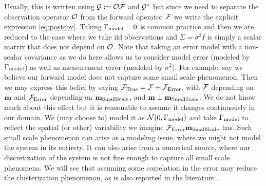 \documentclass{amsart}
\numberwithin{equation}{section}
\begin{document}
Usually, this is written using $\mathcal{G} := \mathcal{O} \mathcal{F}$ and $\mathcal{G}^*$ but
since we need to separate the observation operator $\mathcal{O}$ from the
forward operator $\mathcal{F}$ we write the explicit expression
\eqref{eq:postcov}. Taking $\Gamma_{\textup{model}} = 0$ is common practice
\cite{Tarantola05,KaipioSomersalo05,Vogel02} and then we are reduced
to the case where we take iid observations and $\Sigma = \sigma^2I$ is
simply a scalar matrix that does not depend on $\mathcal{O}$. Note that
taking an error model with a non-scalar covariance as we do here
allows us to consider model error (modeled by $\Gamma_{\textup{model}}$) as well as
measurement error (modeled by $\sigma^2$). For example, say we believe
our forward model does not capture some small scale phenomenon.  Then
we may express this belief by saying $\mathcal{F}_{\textup{True}} = \mathcal{F} + \mathcal{F}_{\textup{Error}}$, with $\mathcal{F}$
depending on $\mathbf{m}$ and $\mathcal{F}_{\textup{Error}}$ depending on $\mathbf{m}_{\textup{SmallScale}}$, and $\mathbf{m}
\perp \mathbf{m}_{\textup{SmallScale}}$. We do not know much about this effect but it is
reasonable to assume it changes continuously in our domain. We (may
choose to) model it as $\mathcal{N} (0, \Gamma_{\textup{model}})$ and take $\Gamma_{\textup{model}}$ to
reflect the spatial (or other) variability we imagine $\mathcal{F}_{\textup{Error}} \mathbf{m}_{\textup{SmallScale}}$
has. Such small scale phenomenon can arise as a modeling issue, where
we might not model the system in its entirety. It can also arise from
a numerical source, where our discretization of the system is not fine
enough to capture all small scale phenomena. We will see that assuming
some correlation in the error may reduce the clusterization
phenomenon, as is also reported in the literature \cite{Ucinski05}.
\end{document}
